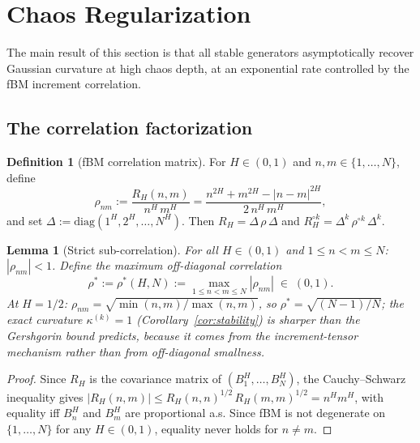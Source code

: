 \documentclass[11pt,a4paper]{article}
\theoremstyle{plain}
\newtheorem{lemma}[theorem]{Lemma}
\theoremstyle{definition}
\newtheorem{definition}[theorem]{Definition}
\theoremstyle{remark}
\begin{document}
\section{Chaos Regularization}\label{sec:regularization}

The main result of this section is that all stable generators
asymptotically recover Gaussian curvature at high chaos depth,
at an exponential rate controlled by the fBM increment
correlation.

\subsection{The correlation factorization}

\begin{definition}[fBM correlation matrix]\label{def:corr}
For $H \in (0,1)$ and $n,m \in \{1,\ldots,N\}$, define
\begin{equation}\label{eq:rho}
  \rho_{nm}
  := \frac{R_H(n,m)}{n^H\,m^H}
  = \frac{n^{2H} + m^{2H} - |n-m|^{2H}}{2\,n^H\,m^H},
\end{equation}
and set $\Delta := \mathrm{diag}(1^H, 2^H, \ldots, N^H)$.
Then $R_H = \Delta\,\rho\,\Delta$ and
$R_H^{\circ k} = \Delta^k\,\rho^{\circ k}\,\Delta^k$.
\end{definition}

\begin{lemma}[Strict sub-correlation]
\label{lem:strict}
For all $H \in (0,1)$ and $1 \leq n < m \leq N$:
$|\rho_{nm}| < 1$.  Define the maximum off-diagonal
correlation
\begin{equation}\label{eq:rhostar}
  \rho^* := \rho^*(H,N) :=
  \max_{1 \leq n < m \leq N} |\rho_{nm}| \;\in\; (0,1).
\end{equation}
At $H = 1/2$:
$\rho_{nm} = \sqrt{\min(n,m)/\max(n,m)}$,
so $\rho^* = \sqrt{(N{-}1)/N}$;
the exact curvature $\kappa^{(k)} = 1$
(Corollary~\textup{\ref{cor:stability}})
is sharper than the Gershgorin bound predicts,
because it comes from the increment-tensor mechanism
rather than from off-diagonal smallness.
\end{lemma}

\begin{proof}
Since $R_H$ is the covariance matrix of
$(B_1^H, \ldots, B_N^H)$, the Cauchy--Schwarz inequality
gives $|R_H(n,m)| \leq R_H(n,n)^{1/2}\,R_H(m,m)^{1/2}
= n^H m^H$, with equality iff $B_n^H$ and $B_m^H$
are proportional a.s.  Since fBM is not degenerate
on $\{1,\ldots,N\}$ for any $H \in (0,1)$,
equality never holds for $n \neq m$.
\end{proof}
\end{document}
